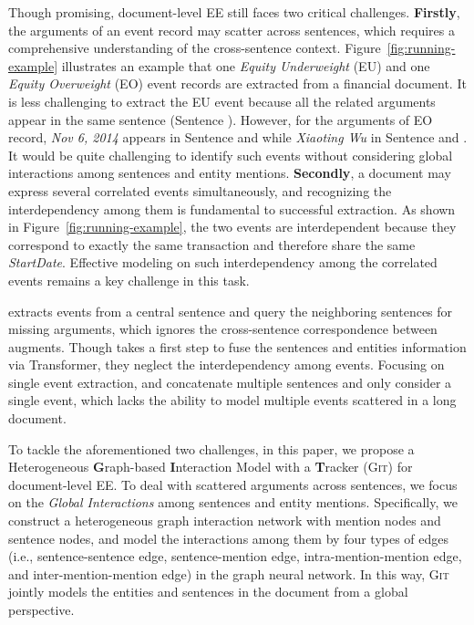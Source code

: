 \documentclass[11pt,a4paper]{article}
\newcommand{\modelname}{\textsc{Git}\xspace}
\begin{document}
Though promising, document-level EE still faces two critical challenges.
\textbf{Firstly}, the arguments of an event record may scatter across sentences, which requires a comprehensive understanding of the cross-sentence context.
Figure~\ref{fig:running-example} illustrates an example that one \textit{Equity Underweight} (EU) and one \textit{Equity Overweight} (EO) event records are extracted from a financial document.
It is less challenging to extract the EU event because all the related arguments appear in the same sentence (Sentence ).
However, for the arguments of EO record, \textit{Nov 6, 2014} appears in Sentence  and  while \textit{Xiaoting Wu} in Sentence  and .
It would be quite challenging to identify such events without considering global interactions among sentences and entity mentions.
\textbf{Secondly}, a document may express several correlated events simultaneously, and recognizing the interdependency among them is fundamental to successful extraction.
As shown in Figure~\ref{fig:running-example}, the two events are interdependent because they correspond to exactly the same transaction and therefore share the same \textit{StartDate}.
Effective modeling on such interdependency among the correlated events remains a key challenge in this task.




\citet{yang-etal-2018-dcfee} extracts events from a central sentence and query the neighboring sentences for missing arguments, which ignores the cross-sentence correspondence between augments.
Though \citet{zheng-etal-2019-doc2edag} takes a first step to fuse the sentences and entities information via Transformer, they neglect the interdependency among events. 
Focusing on single event extraction, \citet{du-cardie-2020-document} and \citet{DBLP:journals/corr/abs-2008-09249} concatenate multiple sentences and only consider a single event, which lacks the ability to model multiple events scattered in a long document.

To tackle the aforementioned two challenges, in this paper, we propose a Heterogeneous \textbf{G}raph-based \textbf{I}nteraction Model with a \textbf{T}racker (\modelname) for document-level EE.
To deal with scattered arguments across sentences, we focus on the \emph{Global Interactions} among sentences and  entity mentions.
Specifically, we construct a heterogeneous graph interaction network with mention nodes and sentence nodes, and model the interactions among them by four types of edges (i.e., sentence-sentence edge, sentence-mention edge, intra-mention-mention edge, and inter-mention-mention edge) in the graph neural network.
In this way, \modelname jointly models the entities and sentences in the document from a global perspective.
\end{document}
